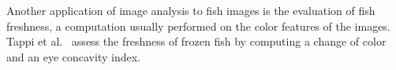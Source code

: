 \documentclass[conference]{IEEEtran}
\begin{document}
Another application of image analysis to fish images is the evaluation of
fish freshness, a computation usually performed on the color features of
the images.
Tappi et al.~\cite{Tappi2017ComputerVS} assess the freshness of frozen
fish by computing a change of color and an eye concavity index.
\end{document}
